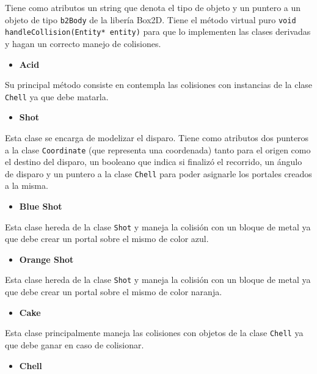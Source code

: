 \documentclass[a4paper]{article}
\begin{document}
Tiene como atributos un string que denota el tipo de objeto y un puntero a un objeto de tipo \texttt{b2Body} de la libería Box2D. Tiene el método virtual puro \texttt{void handleCollision(Entity* entity)} para que lo implementen las clases derivadas y hagan un correcto manejo de colisiones.

\begin{itemize}
	\item \textbf{Acid}
\end{itemize}

Su principal método consiste en contempla las colisiones con instancias de la clase \texttt{Chell} ya que debe matarla.

\newpage
\begin{itemize}
	\item \textbf{Shot}
\end{itemize}

Esta clase se encarga de modelizar el disparo. Tiene como atributos dos punteros a la clase \texttt{Coordinate} (que representa una coordenada) tanto para el origen como el destino del disparo, un booleano que indica si finalizó el recorrido, un ángulo de disparo y un puntero a la clase \texttt{Chell} para poder asignarle los portales creados a la misma.

\begin{itemize}
	\item \textbf{Blue Shot}
\end{itemize}

Esta clase hereda de la clase \texttt{Shot} y maneja la colisión con un bloque de metal ya que debe crear un portal sobre el mismo de color azul.

\begin{itemize}
	\item \textbf{Orange Shot}
\end{itemize}

Esta clase hereda de la clase \texttt{Shot} y maneja la colisión con un bloque de metal ya que debe crear un portal sobre el mismo de color naranja.

\begin{itemize}
	\item \textbf{Cake}
\end{itemize}

Esta clase principalmente maneja las colisiones con objetos de la clase \texttt{Chell} ya que debe ganar en caso de colisionar.

\begin{itemize}
	\item \textbf{Chell}
\end{itemize}
\end{document}
